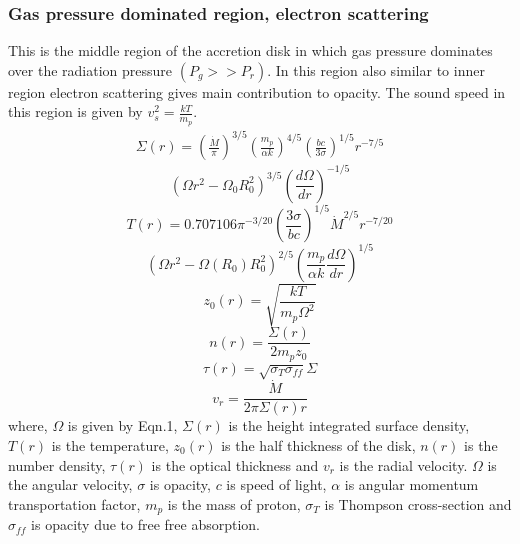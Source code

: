 \documentclass[useAMS,usenatbib]{mn2e}
\begin{document}
\subsubsection{Gas pressure dominated region, electron scattering}
This is the middle region of the accretion disk in which gas pressure dominates over the radiation pressure $(P_g >> P_r)$. In this region also similar to inner region electron scattering gives main contribution to opacity. The sound speed in this region is given by $v^2_s = \frac{kT}{m_p}$. 
\begin{eqnarray}
\Sigma(r) = \left(\frac{\dot{M}}{\pi}\right)^{3/5}\left(\frac{m_p}{\alpha k}\right)^{4/5}\left(\frac{bc}{3\sigma}\right)^{1/5}r^{-7/5} 
\end{eqnarray}
$$ \left(\Omega r^2 -\Omega_0 R_0^2\right)^{3/5}\left(\frac{d\Omega}{dr}\right)^{-1/5}$$
\begin{equation}
T(r) = 0.707106 \pi^{-3/20}\left(\frac{3\sigma}{bc}\right)^{1/5}\dot{M}^{2/5}r^{-7/20}
\end{equation}
$$ \left(\Omega r^2 - \Omega(R_0) R_0^2\right)^{2/5}\left(\frac{m_p}{\alpha k}\frac{d\Omega}{dr}\right)^{1/5}$$
\begin{equation}
z_0(r) = \sqrt{\frac{k T}{m_p\Omega^2}}
\end{equation}
\begin{equation}
n(r) = \frac{\Sigma(r)}{2m_p z_0}
\end{equation}
\begin{equation}
\tau(r) = \sqrt{\sigma_T \sigma_{ff}}\Sigma
\end{equation}
\begin{equation}
v_r = \frac{\dot{M}}{2\pi\Sigma(r) r}
\end{equation}
where, $\Omega$ is given by Eqn.1, $\Sigma(r)$ is the height integrated surface density, $T(r)$ is the temperature, $z_0(r)$ is the half thickness of the disk, $n(r)$ is the number density, $\tau(r)$ is the optical thickness and $v_r$ is the radial velocity. $\Omega$ is the angular velocity, $\sigma$ is opacity, $c$ is speed of light, $\alpha$ is angular momentum transportation factor, $m_p$ is the mass of proton, $\sigma_T$ is Thompson cross-section and $\sigma_{ff}$ is opacity due to free free absorption.
\end{document}
